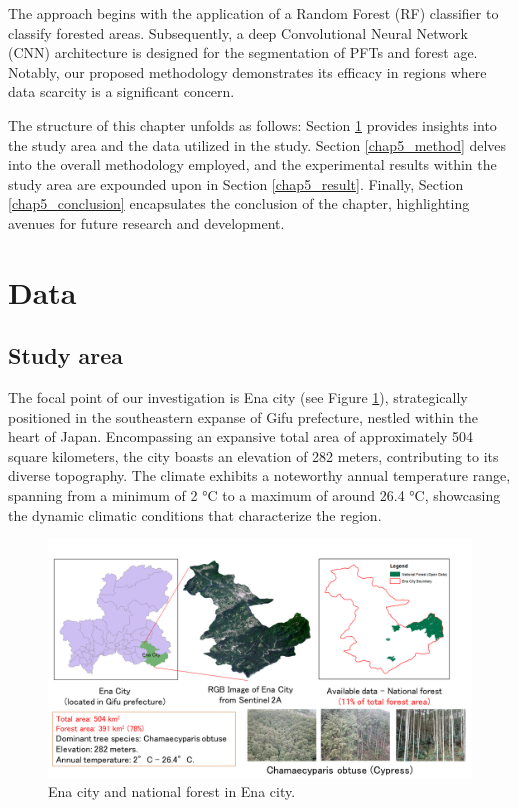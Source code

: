 The approach begins with the application of a Random Forest (RF) classifier to classify forested areas. Subsequently, a deep Convolutional Neural Network (CNN) architecture is designed for the segmentation of PFTs and forest age. Notably, our proposed methodology demonstrates its efficacy in regions where data scarcity is a significant concern. \par

The structure of this chapter unfolds as follows: Section \ref{chap5_data} provides insights into the study area and the data utilized in the study. Section \ref{chap5_method} delves into the overall methodology employed, and the experimental results within the study area are expounded upon in Section \ref{chap5_result}. Finally, Section \ref{chap5_conclusion} encapsulates the conclusion of the chapter, highlighting avenues for future research and development. \par

\section{Data} \label{chap5_data}
\subsection{Study area}
The focal point of our investigation is Ena city (see Figure \ref{fig:chap5_studyarea}), strategically positioned in the southeastern expanse of Gifu prefecture, nestled within the heart of Japan. Encompassing an expansive total area of approximately 504 square kilometers, the city boasts an elevation of 282 meters, contributing to its diverse topography. The climate exhibits a noteworthy annual temperature range, spanning from a minimum of 2 °C to a maximum of around 26.4 °C, showcasing the dynamic climatic conditions that characterize the region. \par

\begin{figure}[tbh!]
    \centering
    \includegraphics[width=\textwidth]{figs/chap5/study_area_ena.png}
    \caption[National forest in Ena city]{Ena city and national forest in Ena city.}
    \label{fig:chap5_studyarea}
\end{figure}

